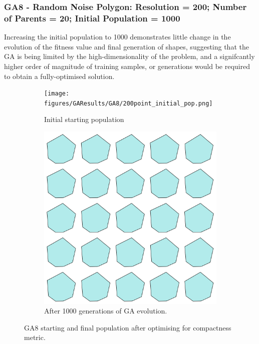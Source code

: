 \documentclass{article}
\begin{document}
\subsubsection*{GA8 - Random Noise Polygon: Resolution = 200; Number of Parents = 20; Initial Population = 1000}

Increasing the initial population to 1000 demonstrates little change in the evolution of the fitness value and final generation of shapes, suggesting that the GA is being limited by the high-dimensionality of the problem, and a signifcantly higher order of magnitude of training samples, or generations would be required to obtain a fully-optimised solution. 

\begin{figure}[H]
    \centering
    \begin{subfigure}[b]{0.45\textwidth}
        \centering
        \texttt{[image: figures/GAResults/GA8/200point\_initial\_pop.png]}
        \caption{Initial starting population}
        \label{fig:GA8_starting}
    \end{subfigure}
    \hfill
    \begin{subfigure}[b]{0.45\textwidth}
        \centering
        \includegraphics[width=\textwidth]{figures/GAResults/GA8/1000gens_20pars_1000initpop_5pcent_mut.png}
        \caption{After 1000 generations of GA evolution.}
        \label{fig:GA8_final}
    \end{subfigure}
    \caption{GA8 starting and final population after optimising for compactness metric.}
    \label{fig:GA8_before_after_GA}
\end{figure}
\end{document}
